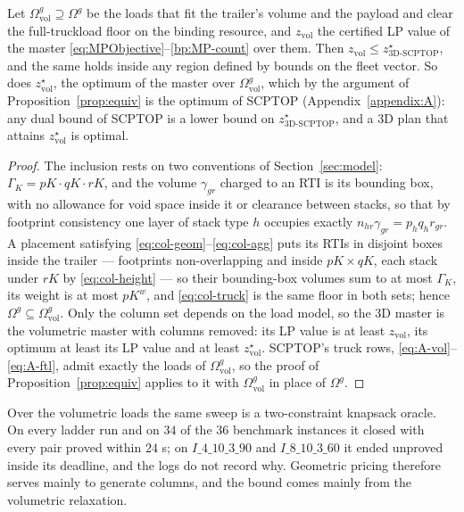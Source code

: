 \begin{proposition}
\label{prop:inclusion}
Let $\Omega^{g}_{\mathrm{vol}}\supseteq\Omega^{g}$ be the loads that
fit the trailer's volume and the payload and clear the full-truckload
floor on the binding resource, and $z_{\mathrm{vol}}$ the certified LP
value of the master \eqref{eq:MPObjective}--\eqref{bp:MP-count} over
them. Then $z_{\mathrm{vol}}\le z^{\star}_{\text{3D-SCPTOP}}$, and the
same holds inside any region defined by bounds on the fleet vector. So
does $z^{\star}_{\mathrm{vol}}$, the optimum of the master over
$\Omega^{g}_{\mathrm{vol}}$, which by the argument of
Proposition~\ref{prop:equiv} is the optimum of SCPTOP
(Appendix~\ref{appendix:A}): any dual bound of SCPTOP is a lower bound
on $z^{\star}_{\text{3D-SCPTOP}}$, and a 3D plan that attains
$z^{\star}_{\mathrm{vol}}$ is optimal.
\end{proposition}
\begin{proof}
The inclusion rests on two conventions of Section~\ref{sec:model}:
$\Gamma_{K}=pK\cdot qK\cdot rK$, and the volume $\gamma_{gr}$ charged
to an RTI is its bounding box, with no allowance for void space inside
it or clearance between stacks, so that by footprint consistency one
layer of stack type $h$ occupies exactly
$n_{hr}\gamma_{gr}=p_{h}q_{h}r_{gr}$. A placement satisfying
\eqref{eq:col-geom}--\eqref{eq:col-agg} puts its RTIs in disjoint boxes
inside the trailer --- footprints non-overlapping and inside
$pK\times qK$, each stack under $rK$ by \eqref{eq:col-height} --- so
their bounding-box volumes sum to at most $\Gamma_{K}$, its weight is
at most $pK^{w}$, and \eqref{eq:col-truck} is the same floor in both
sets; hence $\Omega^{g}\subseteq\Omega^{g}_{\mathrm{vol}}$. Only the
column set depends on the load model, so the 3D master is the
volumetric master with columns removed: its LP value is at least
$z_{\mathrm{vol}}$, its optimum at least its LP value and at least
$z^{\star}_{\mathrm{vol}}$. SCPTOP's truck rows,
\eqref{eq:A-vol}--\eqref{eq:A-ftl}, admit exactly the loads of
$\Omega^{g}_{\mathrm{vol}}$, so the proof of
Proposition~\ref{prop:equiv} applies to it with
$\Omega^{g}_{\mathrm{vol}}$ in place of $\Omega^{g}$.
\end{proof}

\noindent Over the volumetric loads the same sweep is a two-constraint
knapsack oracle. On every ladder run and on $34$ of the $36$ benchmark
instances it closed with every pair proved within $24$ s; on
$I\_4\_10\_3\_90$ and $I\_8\_10\_3\_60$ it ended unproved inside its
deadline, and the logs do not record why. Geometric pricing therefore
serves mainly to generate columns, and the bound comes mainly from the
volumetric relaxation.
